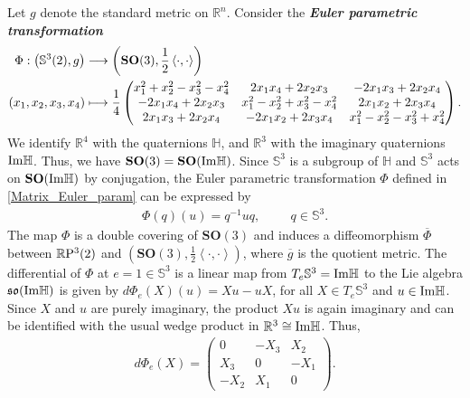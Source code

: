 \documentclass[reqno,11pt]{amsart}
\begin{document}
\noindent
Let $g$ denote the standard metric on $\mathbb{R}^n$. Consider the \textit{\textbf{Euler parametric transformation}} 
\begin{align}
    \label{Matrix_Euler_param} \index{Euler parametric transformation of $\mathbf{SO}(3)$}\nonumber 
    \Phi: \left( \mathbb{S}^3(2),g \right) &\longrightarrow \left(\mathbf{SO}(3), \frac{1}{2}\left\langle\cdot ,\cdot \right\rangle\right)\\ 
    (x_1,x_2,x_3,x_4) &\longmapsto
    \frac{1}{4}\begin{pmatrix}
    x_1^2+x_2^2-x_3^2-x_4^2 & 2x_1x_4 +2x_2x_3 & -2x_1x_3+2x_2x_4\\
    -2x_1x_4 + 2x_2x_3 & x_1^2-x_2^2+x_3^2-x_4^2 & 2x_1x_2+2x_3x_4\\
    2x_1x_3+2x_2x_4 & -2x_1x_2+2x_3x_4 & x_1^2-x_2^2-x_3^2+x_4^2
    \end{pmatrix}.
\end{align}
We identify $\mathbb{R}^4$ with the quaternions $\mathbb{H}$, and $\mathbb{R}^3$ with the imaginary quaternions $\rm{Im}\mathbb{H}$. Thus, we have $\mathbf{SO}(3) = \mathbf{SO}(\rm{Im}\mathbb{H})$. Since $\mathbb{S}^3$ is a subgroup of $\mathbb{H}$ and $\mathbb{S}^3$ acts on $\mathbf{SO}(\rm{Im}\mathbb{H})$ by conjugation, the Euler parametric transformation $\Phi$ defined in \eqref{Matrix_Euler_param} can be expressed by 
\begin{eqnarray*}
    \Phi(q)(u)=q^{-1}uq, \hspace{1cm} q \in \mathbb{S}^3.
\end{eqnarray*}
The map $\Phi$ is a double covering of $\mathbf{SO}(3)$ and induces a diffeomorphism $\overline{\Phi}$ between $\mathbb{R}{\rm{P}}^3(2)$ and $\left(\mathbf{SO}(3), \frac{1}{2}\left\langle\cdot ,\cdot \right\rangle\right)$, where $\overline{g}$ is the quotient metric. The differential of $\Phi$ at $e=1 \in \mathbb{S}^3$ is a linear map from $T_e\mathbb{S}^3 = \rm{Im}\mathbb{H}$ to the Lie algebra $\mathfrak{so}(\rm{Im}\mathbb{H})$ is given by $d \Phi_e(X)(u) =  Xu-uX$, for all $X \in T_e\mathbb{S}^3$ and $u \in \rm{Im}\mathbb{H}$. Since $X$ and $u$ are purely imaginary, the product $Xu$ is again imaginary and can be identified with the usual wedge product in $\mathbb{R}^3 \cong \rm{Im}\mathbb{H}$. Thus,
\begin{align}
    d\Phi_e(X) = \begin{pmatrix}
    0 & -X_3 & X_2\\
    X_3 & 0 & -X_1\\
    -X_2 & X_1 & 0
    \end{pmatrix}.
\end{align}
\end{document}
